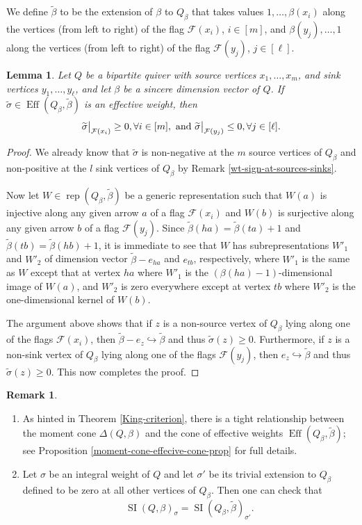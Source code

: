 \documentclass[11pt]{article}
\newtheorem{lemma}[theo]{Lemma}
\theoremstyle{definition}
\newtheorem{rema}[theo]{Remark}
\numberwithin{equation}{section}
\newcommand{\rep}{\operatorname{rep}}
\newcommand{\SI}{\operatorname{SI}}
\newcommand{\F}{\mathcal{F}}
\newcommand{\Eff}{\operatorname{Eff}}
\newcommand\restr[2]{{
  \left.\kern-\nulldelimiterspace 
  #1 
  \vphantom{\big|} 
  \right|_{#2} 
  }}
\begin{document}
We define $\widetilde{\beta}$ to be the extension of $\beta$ to $Q_{\beta}$ that takes values $1, \ldots, \beta(x_i)$ along the vertices (from left to right) of the flag $\F(x_i)$, $i \in [m]$, and $\beta(y_j), \ldots, 1$ along the vertices (from left to right) of the flag $\F(y_j)$, $j \in [\ell]$.

\begin{lemma}\label{eff-wts-cone-flags-lemma} Let $Q$ be a bipartite quiver with source vertices $x_1, \ldots, x_m$, and sink vertices $y_1, \ldots, y_\ell$, and let $\beta$ be a sincere dimension vector of $Q$. If $\widetilde{\sigma} \in \Eff(Q_\beta, \widetilde{\beta})$ is an effective weight, then
$$
\restr{\widetilde{\sigma}}{\F(x_i)}\geq 0, \forall i \in [m], \text{~and~} \restr{\widetilde{\sigma}}{\F(y_j)}\leq 0, \forall j \in [\ell].
$$
\end{lemma}

\begin{proof} We already know that $\widetilde{\sigma}$ is non-negative at the $m$ source vertices of $Q_\beta$ and non-positive at the $l$ sink vertices of $Q_\beta$ by Remark \ref{wt-sign-at-sources-sinks}.

Now let $W \in \rep(Q_\beta, \widetilde{\beta})$ be a generic representation such that $W(a)$ is injective along any given arrow $a$ of a flag $\F(x_i)$ and $W(b)$ is surjective along any given arrow $b$ of a flag $\F(y_j)$.  Since $\widetilde{\beta}(ha)=\widetilde{\beta}(ta)+1$ and $\widetilde{\beta}(tb)=\widetilde{\beta}(hb)+1$, it is immediate to see that $W$ has subrepresentations $W'_1$ and $W'_2$ of dimension vector $\widetilde{\beta}-e_{ha}$ and $e_{tb}$, respectively, where $W'_1$ is the same as $W$ except that at vertex $ha$ where $W'_1$ is the $(\beta(ha)-1)$-dimensional image of $W(a)$, and $W'_2$ is zero everywhere except at vertex $tb$ where $W'_2$ is the one-dimensional kernel of $W(b)$. 

The argument above shows that if $z$ is a non-source vertex of  $Q_\beta$ lying along one of the flags $\F(x_i)$, then $\widetilde{\beta}-e_z \hookrightarrow \widetilde{\beta}$ and thus $\widetilde{\sigma}(z) \geq 0$. Furthermore, if $z$ is a non-sink vertex of $Q_\beta$ lying along one of the flags $\F(y_j)$, then $e_z \hookrightarrow \widetilde{\beta}$ and thus $\widetilde{\sigma}(z) \geq 0$. This now completes the proof.
\end{proof}

\begin{rema} 
\begin{enumerate}
\item As hinted in Theorem \ref{King-criterion}, there is a tight relationship between the moment cone $\Delta(Q, \beta)$ and the cone of effective weights $\Eff(Q_\beta, \widetilde{\beta})$; see Proposition \ref{moment-cone-effecive-cone-prop} for full details.

\item Let $\sigma$ be an integral weight of $Q$ and let $\sigma'$ be its trivial extension to $Q_\beta$ defined to be zero at all other vertices of $Q_\beta$. Then one can check that 
$$
\SI(Q, \beta)_\sigma=\SI(Q_{\beta}, \widetilde{\beta})_{\sigma'}.
$$
\end{enumerate}
\end{rema}
\end{document}
